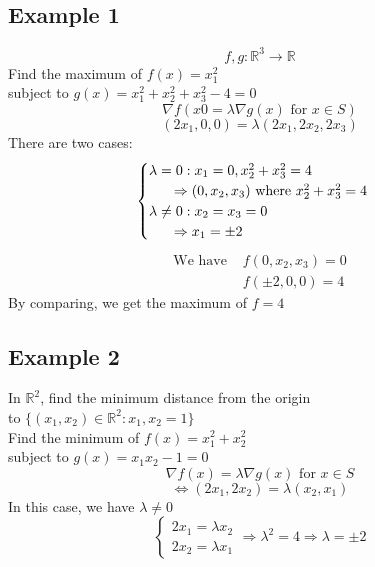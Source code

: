 \documentclass[12pt]{article}
\newcommand{\BR}{\mathbb R}
\begin{document}
\subsection*{Example 1}
\[ f,g:\BR^3\rightarrow\BR \]
Find the maximum of $f(x) = x_1^2$ \\
subject to $g(x)=x_1^2+x_2^2+x_3^2-4=0$ \\
\[ \nabla f(x0 = \lambda\nabla g(x)\text{ for }x\in S) \]
\[ (2x_1,0,0) = \lambda(2x_1,2x_2,2x_3) \]
There are two cases: \\
\begin{equation*}
  \begin{cases}
      \lambda = 0: x_1=0,x_2^2+x_3^2=4 \\
      \indent\Rightarrow (0,x_2,x_3) \text{ where } x_2^2+x_3^2=4 \\
      \lambda \neq 0: x_2=x_3=0 \\
      \indent\Rightarrow x_1=\pm 2 \\
  \end{cases}
\end{equation*}
\begin{align*}
  \text{We have } & f(0,x_2,x_3)=0 \\
  & f(\pm2,0,0)=4
\end{align*}
By comparing, we get the maximum of $f = 4$ \\
\subsection*{Example 2}
In $\BR^2$, find the minimum distance from the origin \\
to $\big\{(x_1,x_2)\in\BR^2:x_1,x_2=1\big\}$ \\
Find the minimum of $f(x)=x_1^2+x_2^2$ \\
subject to $g(x)=x_1x_2-1=0$ \\
\[ \nabla f(x) = \lambda\nabla g(x) \text{ for }x\in S \]
\[ \iff (2x_1,2x_2)=\lambda(x_2,x_1) \]
In this case, we have $\lambda\neq0$ \\
\begin{equation*}
  \begin{cases}
    2x_1 = \lambda x_2 \\
    2x_2 = \lambda x_1
  \end{cases}
  \Rightarrow\lambda^2=4\Rightarrow\lambda=\pm2
\end{equation*}
 \\
\end{document}
